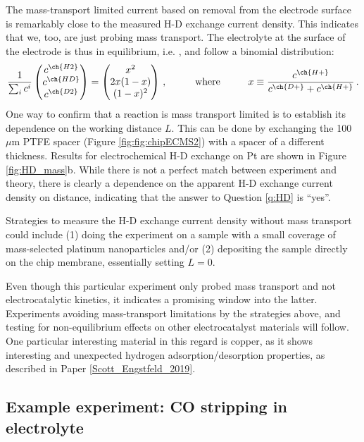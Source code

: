 The mass-transport limited current based on  removal from the electrode surface is remarkably close to the measured H-D exchange current density. This indicates that we, too, are just probing mass transport. The electrolyte at the surface of the electrode is thus in equilibrium, i.e. ,  and  follow a binomial distribution:
\begin{equation}
\frac{1}{\sum_i c^i}\begin{pmatrix}
c^{\ch{H2}}\\c^{\ch{HD}}\\c^{\ch{D2}}
\end{pmatrix}
= \begin{pmatrix}
x^2\\ 2x(1-x)\\ (1-x)^2
\end{pmatrix}\,,\hspace{1cm}\text{where}\hspace{1cm}
x \equiv \frac{c^{\ch{H+}}}{c^{\ch{D+}} + c^{\ch{H+}}}\,.
\end{equation}
One way to confirm that a reaction is mass transport limited is to establish its dependence on the working distance $L$. This can be done by exchanging the 100 $\mu$m PTFE spacer (Figure \ref{fig:fig:chipECMS2}) with a spacer of a different thickness. Results for electrochemical H-D exchange on Pt are shown in Figure \ref{fig:HD_mass}b. While there is not a perfect match between experiment and theory, there is clearly a dependence on the apparent H-D exchange current density on distance, indicating that the answer to Question \ref{q:HD} is ``yes''.

Strategies to measure the H-D exchange current density without mass transport could include (1) doing the experiment on a sample with a small coverage of mass-selected platinum nanoparticles and/or (2) depositing the sample directly on the chip membrane, essentially setting $L=0$.

Even though this particular experiment only probed mass transport and not electrocatalytic kinetics, it indicates a promising window into the latter. Experiments avoiding mass-transport limitations by the strategies above, and testing for non-equilibrium effects on other electrocatalyst materials will follow. One particular interesting material in this regard is copper, as it shows interesting and unexpected hydrogen adsorption/desorption properties, as described in Paper \ref{Scott_Engstfeld_2019}.


\subsection{Example experiment: CO stripping in  electrolyte}\label{subsec:isotope_CO2}

